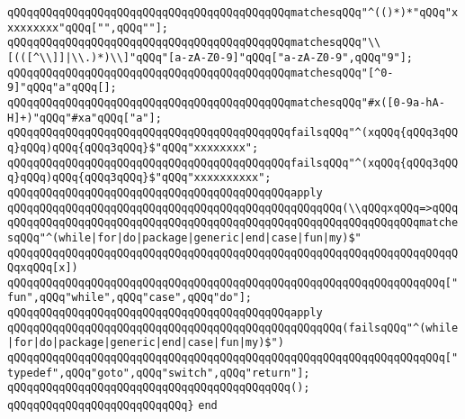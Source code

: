 \verb|qQQqqQQqqQQqqQQqqQQqqQQqqQQqqQQqqQQqqQQqqQQqmatchesqQQq"^(()*)*"qQQq"xxxxxxxxx"qQQq["",qQQq""];|\newline
\verb|qQQqqQQqqQQqqQQqqQQqqQQqqQQqqQQqqQQqqQQqqQQqmatchesqQQq"\\[(([^\\]]|\verb#|\\.)*)\\]"qQQq"[a-zA-Z0-9]"qQQq["a-zA-Z0-9",qQQq"9"];#\newline
\verb|qQQqqQQqqQQqqQQqqQQqqQQqqQQqqQQqqQQqqQQqqQQqmatchesqQQq"[^0-9]"qQQq"a"qQQq[];|\newline
\verb|qQQqqQQqqQQqqQQqqQQqqQQqqQQqqQQqqQQqqQQqqQQqmatchesqQQq"#x([0-9a-hA-H]+)"qQQq"#xa"qQQq["a"];|\newline
\verb|qQQqqQQqqQQqqQQqqQQqqQQqqQQqqQQqqQQqqQQqqQQqfailsqQQq"^(xqQQq{qQQq3qQQq}qQQq)qQQq{qQQq3qQQq}$"qQQq"xxxxxxxx";|\newline
\verb|qQQqqQQqqQQqqQQqqQQqqQQqqQQqqQQqqQQqqQQqqQQqfailsqQQq"^(xqQQq{qQQq3qQQq}qQQq)qQQq{qQQq3qQQq}$"qQQq"xxxxxxxxxx";|\newline
\newline
\verb|qQQqqQQqqQQqqQQqqQQqqQQqqQQqqQQqqQQqqQQqqQQqapply|\newline
\verb|qQQqqQQqqQQqqQQqqQQqqQQqqQQqqQQqqQQqqQQqqQQqqQQqqQQq(\\qQQqxqQQq=>qQQq|\newline
\verb|qQQqqQQqqQQqqQQqqQQqqQQqqQQqqQQqqQQqqQQqqQQqqQQqqQQqqQQqqQQqqQQqmatchesqQQq"^(while|\verb#|for|do|package|generic|end|case|fun|my)$"#\newline
\verb|qQQqqQQqqQQqqQQqqQQqqQQqqQQqqQQqqQQqqQQqqQQqqQQqqQQqqQQqqQQqqQQqqQQqqQQqxqQQq[x])|\newline
\verb|qQQqqQQqqQQqqQQqqQQqqQQqqQQqqQQqqQQqqQQqqQQqqQQqqQQqqQQqqQQqqQQqqQQq["fun",qQQq"while",qQQq"case",qQQq"do"];|\newline
\newline
\verb|qQQqqQQqqQQqqQQqqQQqqQQqqQQqqQQqqQQqqQQqqQQqapply|\newline
\verb|qQQqqQQqqQQqqQQqqQQqqQQqqQQqqQQqqQQqqQQqqQQqqQQqqQQq(failsqQQq"^(while|\verb#|for|do|package|generic|end|case|fun|my)$")#\newline
\verb|qQQqqQQqqQQqqQQqqQQqqQQqqQQqqQQqqQQqqQQqqQQqqQQqqQQqqQQqqQQqqQQqqQQq["typedef",qQQq"goto",qQQq"switch",qQQq"return"];|\newline
\newline
\verb|qQQqqQQqqQQqqQQqqQQqqQQqqQQqqQQqqQQqqQQqqQQq();|\newline
\verb|qQQqqQQqqQQqqQQqqQQqqQQqqQQq}|\newline
\newline
\verb|end|\newline

